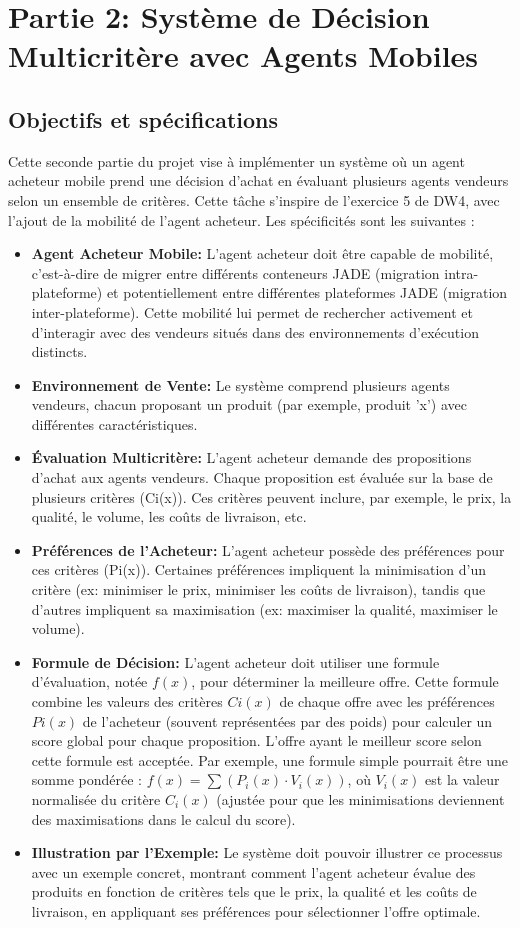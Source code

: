 \documentclass[a4paper,12pt]{report}
\begin{document}
\chapter{Partie 2: Système de Décision Multicritère avec Agents Mobiles}

\section{Objectifs et spécifications}
Cette seconde partie du projet vise à implémenter un système où un agent acheteur mobile prend une décision d'achat en évaluant plusieurs agents vendeurs selon un ensemble de critères. Cette tâche s'inspire de l'exercice 5 de DW4, avec l'ajout de la mobilité de l'agent acheteur. Les spécificités sont les suivantes :
\begin{itemize}
    \item \textbf{Agent Acheteur Mobile:} L'agent acheteur doit être capable de mobilité, c'est-à-dire de migrer entre différents conteneurs JADE (migration intra-plateforme) et potentiellement entre différentes plateformes JADE (migration inter-plateforme). Cette mobilité lui permet de rechercher activement et d'interagir avec des vendeurs situés dans des environnements d'exécution distincts.
    \item \textbf{Environnement de Vente:} Le système comprend plusieurs agents vendeurs, chacun proposant un produit (par exemple, produit 'x') avec différentes caractéristiques.
    \item \textbf{Évaluation Multicritère:} L'agent acheteur demande des propositions d'achat aux agents vendeurs. Chaque proposition est évaluée sur la base de plusieurs critères (Ci(x)). Ces critères peuvent inclure, par exemple, le prix, la qualité, le volume, les coûts de livraison, etc.
    \item \textbf{Préférences de l'Acheteur:} L'agent acheteur possède des préférences pour ces critères (Pi(x)). Certaines préférences impliquent la minimisation d'un critère (ex: minimiser le prix, minimiser les coûts de livraison), tandis que d'autres impliquent sa maximisation (ex: maximiser la qualité, maximiser le volume).
    \item \textbf{Formule de Décision:} L'agent acheteur doit utiliser une formule d'évaluation, notée \(f(x)\), pour déterminer la meilleure offre. Cette formule combine les valeurs des critères \(Ci(x)\) de chaque offre avec les préférences \(Pi(x)\) de l'acheteur (souvent représentées par des poids) pour calculer un score global pour chaque proposition. L'offre ayant le meilleur score selon cette formule est acceptée. Par exemple, une formule simple pourrait être une somme pondérée : \(f(x) = \sum (P_i(x) \cdot V_i(x))\), où \(V_i(x)\) est la valeur normalisée du critère \(C_i(x)\) (ajustée pour que les minimisations deviennent des maximisations dans le calcul du score).
    \item \textbf{Illustration par l'Exemple:} Le système doit pouvoir illustrer ce processus avec un exemple concret, montrant comment l'agent acheteur évalue des produits en fonction de critères tels que le prix, la qualité et les coûts de livraison, en appliquant ses préférences pour sélectionner l'offre optimale.
\end{itemize}
\end{document}
